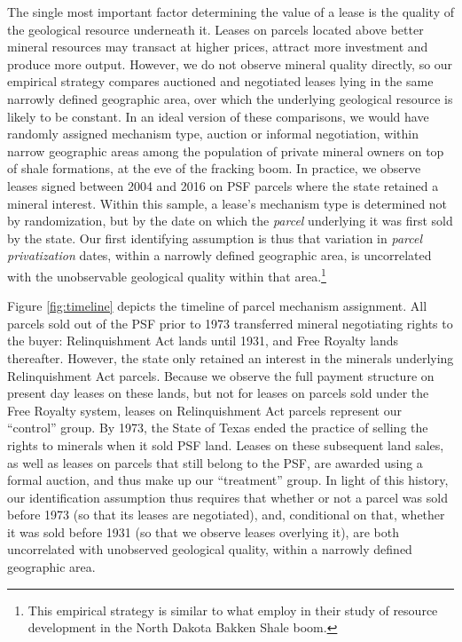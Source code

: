 The single most important factor determining the value of a lease is the quality of the geological resource underneath it. Leases on parcels located above better mineral resources may transact at higher prices, attract more investment and produce more output. However, we do not observe mineral quality directly, so our empirical strategy compares auctioned and negotiated leases lying in the same narrowly defined geographic area, over which the underlying geological resource is likely to be constant. In an ideal version of these comparisons, we would have randomly assigned mechanism type, auction or informal negotiation, within narrow geographic areas among the population of private mineral owners on top of shale formations, at the eve of the fracking boom. In practice, we observe leases signed between 2004 and 2016 on PSF parcels where the state retained a mineral interest. Within this sample, a lease's mechanism type is determined not by randomization, but by the date on which the \emph{parcel} underlying it was first sold by the state. Our first identifying assumption is thus that variation in \emph{parcel privatization} dates, within a narrowly defined geographic area, is uncorrelated with the unobservable geological quality within that area.\footnote{This empirical strategy is similar to what \cite{leonard2021fragmented} employ in their study of resource development in the North Dakota Bakken Shale boom.}

Figure \ref{fig:timeline} depicts the timeline of parcel mechanism assignment. All parcels sold out of the PSF prior to 1973 transferred mineral negotiating rights to the buyer: Relinquishment Act lands until 1931, and Free Royalty lands thereafter. However, the state only retained an interest in the minerals underlying Relinquishment Act parcels. Because we observe the full payment structure on present day leases on these lands, but not for leases on parcels sold under the Free Royalty system, leases on Relinquishment Act parcels represent our ``control'' group.  By 1973, the State of Texas ended the practice of selling the rights to minerals when it sold PSF land. Leases on these subsequent land sales, as well as leases on parcels that still belong to the PSF, are awarded using a formal auction, and thus make up our ``treatment'' group.  In light of this history, our identification assumption thus requires that whether or not a parcel was sold before 1973 (so that its leases are negotiated), and, conditional on that, whether it was sold before 1931 (so that we observe leases overlying it), are both uncorrelated with unobserved geological quality, within a narrowly defined geographic area.

